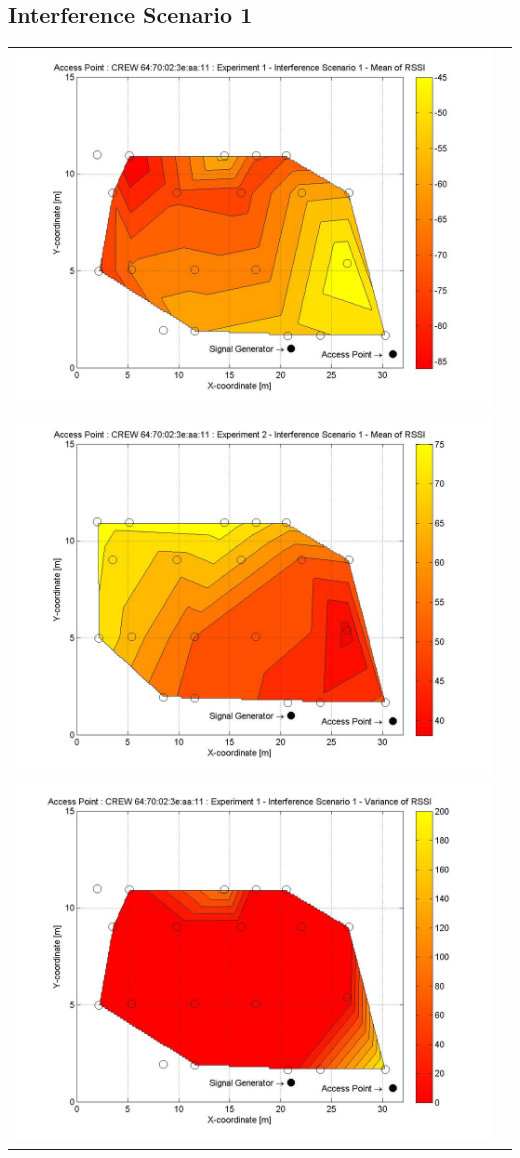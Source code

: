 \documentclass[11pt,a4paper,headinclude,footinclude,chapterprefix=on]{scrreprt}
\begin{document}
\subsection{Interference Scenario 1} 
\begin{longtable}
	{lr} 
	\includegraphics[width=13cm]{../../Source/plot/CREW_11/11_Sig_Ex_1_Mean.jpg} \\
	\includegraphics[width=13cm]{../../Source/plot/CREW_11/11_Sig_Ex_2_Mean.jpg} \\
	\includegraphics[width=13cm]{../../Source/plot/CREW_11/11_Sig_Ex_1_Variance.jpg} \\

\end{longtable}
\end{document}
